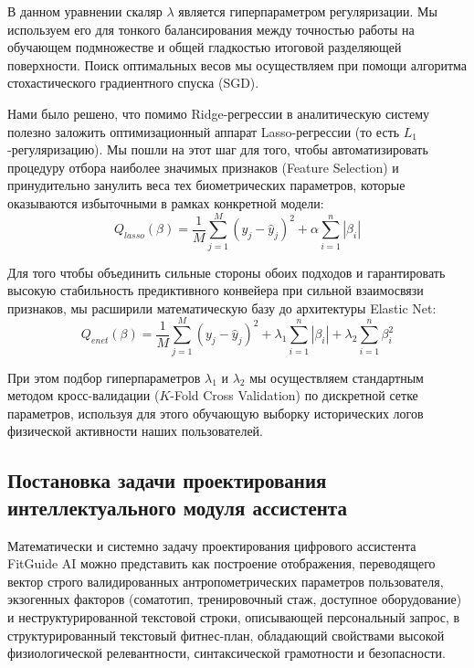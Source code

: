 \documentclass[14pt, a4paper]{extarticle}
\begin{document}
В данном уравнении скаляр $\lambda$ является гиперпараметром регуляризации. Мы используем его для тонкого балансирования между точностью работы на обучающем подмножестве и общей гладкостью итоговой разделяющей поверхности. Поиск оптимальных весов мы осуществляем при помощи алгоритма стохастического градиентного спуска (SGD).

Нами было решено, что помимо Ridge-регрессии в аналитическую систему полезно заложить оптимизационный аппарат Lasso-регрессии (то есть $L_1$-регуляризацию). Мы пошли на этот шаг для того, чтобы автоматизировать процедуру отбора наиболее значимых признаков (Feature Selection) и принудительно занулить веса тех биометрических параметров, которые оказываются избыточными в рамках конкретной модели:
\begin{equation}
Q_{lasso}(\beta) = \frac{1}{M} \sum_{j=1}^{M} (y_j - \hat{y}_j)^2 + \alpha \sum_{i=1}^{n} |\beta_i|
\end{equation}

Для того чтобы объединить сильные стороны обоих подходов и гарантировать высокую стабильность предиктивного конвейера при сильной взаимосвязи признаков, мы расширили математическую базу до архитектуры Elastic Net:
\begin{equation}
Q_{enet}(\beta) = \frac{1}{M} \sum_{j=1}^{M} (y_j - \hat{y}_j)^2 + \lambda_1 \sum_{i=1}^{n} |\beta_i| + \lambda_2 \sum_{i=1}^{n} \beta_i^2
\end{equation}

При этом подбор гиперпараметров $\lambda_1$ и $\lambda_2$ мы осуществляем стандартным методом кросс-валидации ($K$-Fold Cross Validation) по дискретной сетке параметров, используя для этого обучающую выборку исторических логов физической активности наших пользователей.


\subsection{Постановка задачи проектирования интеллектуального модуля ассистента}

Математически и системно задачу проектирования цифрового ассистента FitGuide AI можно представить как построение отображения, переводящего вектор строго валидированных антропометрических параметров пользователя, экзогенных факторов (соматотип, тренировочный стаж, доступное оборудование) и неструктурированной текстовой строки, описывающей персональный запрос, в структурированный текстовый фитнес-план, обладающий свойствами высокой физиологической релевантности, синтаксической грамотности и безопасности.
\end{document}
